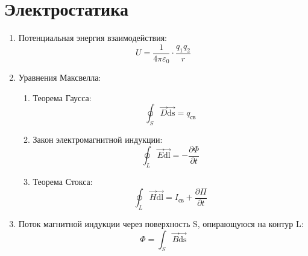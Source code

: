 	\section{Электростатика}
	\begin{enumerate}
		\item Потенциальная энергия взаимодействия: \[U = \frac{1}{4 \pi \varepsilon_0} \cdot \frac{q_1 q_2}{r}\]
		\item Уравнения Максвелла:
		\begin{enumerate}
			\item Теорема Гаусса: \[ \oint_S \overrightarrow{D} \overrightarrow{\mathrm{ds}} = q_{св}\]
			\item Закон электромагнитной индукции: \[ \oint_L \overrightarrow{E} \overrightarrow{\mathrm{dl}} = - \frac{\partial{\Phi}}{\partial{t}} \]
			\item  Теорема Стокса: \[ \oint_L \overrightarrow{H} \overrightarrow{\mathrm{dl}} = I_{св} + \frac{\partial{\Pi}}{\partial{t}}\]
		\end{enumerate}
		\item Поток магнитной индукции через поверхность S, опирающуюся на контур L: \[ \Phi =  \int_S \overrightarrow{B} \overrightarrow{\mathrm{ds}}\]

\end{enumerate}
